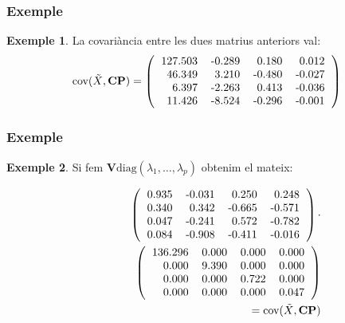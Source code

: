 \documentclass[12pt,t]{beamer}
\theoremstyle{plain}
\theoremstyle{definition}
\newtheorem{exemple}{Exemple}
\begin{document}
\begin{frame}
\frametitle{Exemple}
\begin{exemple}
La covariància entre les dues matrius anteriors val:
\[
\mbox{cov}(\tilde{X},{\mathbf{CP}})=\left(
\begin{tabular}{rrrr}
  127.503 & -0.289 & 0.180 & 0.012 \\ 
  46.349 & 3.210 & -0.480 & -0.027 \\ 
  6.397 & -2.263 & 0.413 & -0.036 \\ 
  11.426 & -8.524 & -0.296 & -0.001 \\ 
  \end{tabular}\right)
\]

\end{exemple}
\end{frame}


\begin{frame}
\frametitle{Exemple}
\begin{exemple}
Si fem $\mathbf{V}\mbox{diag}(\lambda_1,\ldots,\lambda_p)$ obtenim el mateix:
{
\begin{eqnarray*}
&&\left(
\begin{tabular}{rrrr}
  0.935 & -0.031 & 0.250 & 0.248 \\ 
  0.340 & 0.342 & -0.665 & -0.571 \\ 
  0.047 & -0.241 & 0.572 & -0.782 \\ 
  0.084 & -0.908 & -0.411 & -0.016 \\ 
  \end{tabular}\right)\cdot
\\ && \hspace*{1cm}\left(
\begin{tabular}{rrrr}
  136.296 & 0.000 & 0.000 & 0.000 \\ 
  0.000 & 9.390 & 0.000 & 0.000 \\ 
  0.000 & 0.000 & 0.722 & 0.000 \\ 
  0.000 & 0.000 & 0.000 & 0.047 \\ 
  \end{tabular}\right) \\ && = \mbox{cov}(\tilde{X},{\mathbf{CP}})
\end{eqnarray*}

}

\end{exemple}
\end{frame}
\end{document}
